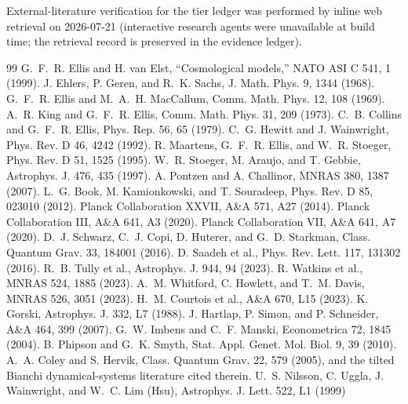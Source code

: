 \documentclass[10pt]{article}
\theoremstyle{definition}
\begin{document}
External-literature verification for the tier ledger was performed by
inline web retrieval on 2026-07-21 (interactive research agents were
unavailable at build time; the retrieval record is preserved in the
evidence ledger).

\begin{thebibliography}{99}\footnotesize
{} G.~F.~R. Ellis and H. van Elst,
``Cosmological models,'' NATO ASI C 541, 1 (1999).
 J. Ehlers, P. Geren, and R.~K. Sachs,
J. Math. Phys. 9, 1344 (1968).
 G.~F.~R. Ellis and M.~A.~H. MacCallum,
Comm. Math. Phys. 12, 108 (1969).
 A.~R. King and G.~F.~R. Ellis,
Comm. Math. Phys. 31, 209 (1973).
 C.~B. Collins and G.~F.~R. Ellis,
Phys. Rep. 56, 65 (1979).
 C.~G. Hewitt and J. Wainwright,
Phys. Rev. D 46, 4242 (1992).
 R. Maartens, G.~F.~R. Ellis, and W.~R. Stoeger,
Phys. Rev. D 51, 1525 (1995).
 W.~R. Stoeger, M. Araujo, and T. Gebbie,
Astrophys. J. 476, 435 (1997).
 A. Pontzen and A. Challinor,
MNRAS 380, 1387 (2007).
 L.~G. Book, M. Kamionkowski,
and T. Souradeep, Phys. Rev. D 85, 023010 (2012).
 Planck Collaboration XXVII,
A\&A 571, A27 (2014).
 Planck Collaboration III,
A\&A 641, A3 (2020).
 Planck Collaboration VII,
A\&A 641, A7 (2020).
 D.~J. Schwarz, C.~J. Copi, D. Huterer, and
G.~D. Starkman, Class. Quantum Grav. 33, 184001 (2016).
 D. Saadeh et al.,
Phys. Rev. Lett. 117, 131302 (2016).
 R.~B. Tully et al., Astrophys. J. 944, 94 (2023).
 R. Watkins et al., MNRAS 524, 1885 (2023).
 A.~M. Whitford, C. Howlett, and T.~M. Davis,
MNRAS 526, 3051 (2023).
 H.~M. Courtois et al., A\&A 670, L15 (2023).
 K. Gorski, Astrophys. J. 332, L7 (1988).
 J. Hartlap, P. Simon, and P. Schneider,
A\&A 464, 399 (2007).
 G.~W. Imbens and C.~F. Manski,
Econometrica 72, 1845 (2004).
 B. Phipson and G.~K. Smyth,
Stat. Appl. Genet. Mol. Biol. 9, 39 (2010).
 A.~A. Coley and S. Hervik,
Class. Quantum Grav. 22, 579 (2005), and the tilted Bianchi
dynamical-systems literature cited therein.
 U.~S. Nilsson, C. Uggla, J. Wainwright, and
W.~C. Lim (Hsu), Astrophys. J. Lett. 522, L1 (1999)

\end{thebibliography}
\end{document}
